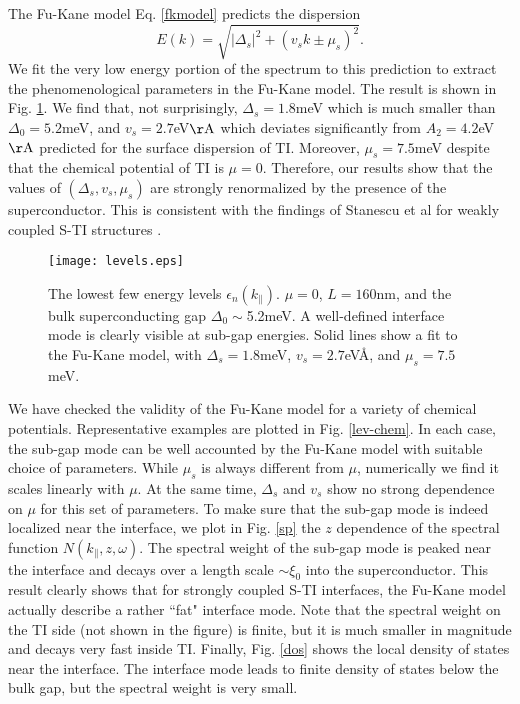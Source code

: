 \documentclass[11pt]{report}
\begin{document}
The Fu-Kane model Eq. \eqref{fkmodel} predicts the dispersion 
\begin{equation}
E(k)=\sqrt{|\Delta_s|^2+(v_sk \pm\mu_s)^2}.
\end{equation}
We fit the very low energy portion of the spectrum to this prediction to
extract the phenomenological parameters in the Fu-Kane model. The result
is shown in Fig. \ref{lev-fk}. We find that,
not surprisingly, $\Delta_s=1.8$meV which is much smaller than $\Delta_0=5.2$meV, and 
$v_s=2.7$eV$\mathrm{\AA}$ which deviates significantly 
from $A_2=4.2$eV$\mathrm{\AA}$ predicted for the surface 
dispersion of TI. Moreover, $\mu_s=7.5$meV despite that the chemical potential
of TI is $\mu=0$. Therefore, our results show that the values of $(\Delta_s,v_s,\mu_s)$
are strongly renormalized by the presence of the superconductor. This is consistent 
with the findings of Stanescu et al for weakly coupled S-TI structures \cite{stan}. 

\begin{figure}
\texttt{[image: levels.eps]}
\caption{The lowest few energy levels $\epsilon_n(k_\parallel)$. 
$\mu=0$, $L=160$nm, and the bulk superconducting gap $\Delta_0\sim$5.2meV.
A well-defined interface mode is clearly visible at sub-gap energies.
Solid lines show a fit to the Fu-Kane model, with $\Delta_s=1.8$meV, 
$v_s=2.7$eV\AA, and $\mu_s=7.5$meV.
}\label{lev-fk}
\end{figure}

We have checked the validity of the Fu-Kane model for a variety of chemical potentials.
Representative examples are plotted in Fig. \ref{lev-chem}. In each case, the sub-gap 
mode can be well accounted by the Fu-Kane 
model with suitable choice of parameters. While $\mu_s$ is always different from $\mu$,
numerically we find it scales linearly with $\mu$. At the same time, 
$\Delta_s$ and $v_s$ show no strong dependence on $\mu$ for this set of parameters.
To make sure that the sub-gap mode is indeed localized near the interface, we plot in 
Fig. \ref{sp} the $z$ dependence of the spectral function $N(k_\parallel,z,\omega)$.
%
The spectral weight of the sub-gap mode is peaked near the interface and decays over 
a length scale $\sim \xi_0$ into the superconductor. This result clearly shows
that for strongly coupled S-TI interfaces, the Fu-Kane model actually describe a
rather ``fat" interface mode. Note that the spectral weight on the TI side 
(not shown in the figure) is finite, 
but it is much smaller in magnitude and decays very fast inside TI. Finally,
Fig. \ref{dos} shows the local density of states near the interface.
The interface mode leads to finite density of states below the bulk gap,
but the spectral weight is very small.
\end{document}
